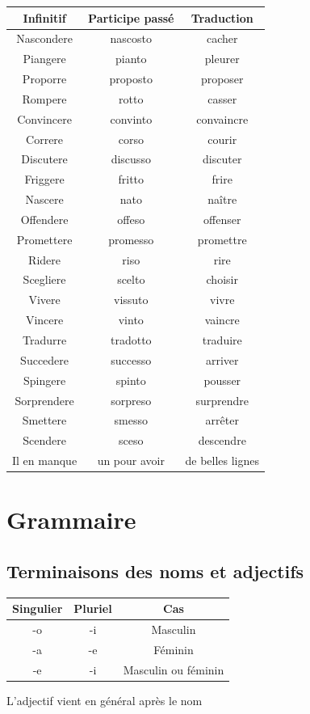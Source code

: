 \documentclass[12pt, openany]{report}
\begin{document}
\begin{minipage}{.5\textwidth}
    \begin{center}
        \begin{tabular}{c|c|c}
            Infinitif & Participe passé & Traduction\\ \hline
            Nascondere & nascosto & cacher\\
            Piangere & pianto & pleurer\\
            Proporre & proposto & proposer\\
            Rompere & rotto & casser\\
            Convincere & convinto & convaincre\\
            Correre & corso & courir\\
            Discutere & discusso & discuter\\
            Friggere & fritto & frire\\
            Nascere & nato & naître\\
            Offendere & offeso & offenser\\
            Promettere & promesso & promettre\\
            Ridere & riso & rire\\
            Scegliere & scelto & choisir\\
            Vivere & vissuto & vivre\\
            Vincere & vinto & vaincre\\
            Tradurre & tradotto & traduire\\
            Succedere & successo & arriver\\
            Spingere & spinto & pousser\\
            Sorprendere & sorpreso & surprendre\\
            Smettere & smesso & arrêter\\
            Scendere & sceso & descendre\\
            Il en manque &un pour avoir &de belles lignes\\
        \end{tabular}
    \end{center}
\end{minipage}
\chapter{Grammaire}
\section{Terminaisons des noms et adjectifs}
\begin{center}
    \begin{tabular}{c|c|c}
        Singulier & Pluriel & Cas\\
        \hline
        -o & -i & Masculin \\
        -a & -e & Féminin \\
        -e & -i & Masculin ou féminin\\
    \end{tabular}
\end{center}
L'adjectif vient en général après le nom 
\end{document}
